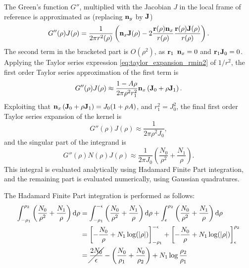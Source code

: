 The Green's function $G''$, multiplied with the Jacobian $J$ in the local frame of reference is approximated as (replacing ${\bf n}_y$ by ${\bf J}$)
%
\begin{equation}
	G''(\rho) J(\rho)
	= \frac{1}{2\pi r^2(\rho)} \left( {\bf n}_x {\bf J}(\rho) - 2 \frac{{\bf r}(\rho) {\bf n}_x}{r(\rho)} \frac{{\bf r}(\rho) {\bf J}(\rho)}{r(\rho)}\right)
	.
\end{equation}
%
The second term in the bracketed part is $O(\rho^2)$, as ${\bf r}_1$ ${\bf n}_x = 0$ and ${\bf r}_1 {\bf J}_0 = 0$.
Applying the Taylor series expression \eqref{eq:taylor_expansion_rmin2} of $1/r^2$, the first order Taylor series approximation of the first term is
%
\begin{equation}
	G''(\rho) J(\rho) \approx \frac{1 - A \rho}{2\pi \rho^2 r_1^2} {\bf n}_x \left({\bf J}_0 + \rho {\bf J}_1\right) 
	.
\end{equation}
%
Exploiting that ${\bf n}_x \left({\bf J}_0 + \rho {\bf J}_1\right) = J_0 (1 + \rho A)$, and $r_1^2 = J_0^2$, the final first order Taylor series expansion of the kernel is
%
\begin{equation}
	G''(\rho) J(\rho) \approx \frac{1}{2\pi \rho^2 J_0}
	,
\end{equation}
%
and the singular part of the integrand is
%
\begin{equation}
	G''(\rho) N(\rho) J(\rho) \approx \frac{1}{2\pi J_0} \left( \frac{N_0}{\rho^2} +  \frac{N_1}{\rho} \right)
	.
\end{equation}
%
This integral is evaluated analytically using Hadamard Finite Part integration, and the remaining part is evaluated numerically, using Gaussian quadratures.

The Hadamard Finite Part integration is performed as follows:
%
\begin{align}
	\int_{-\rho_1}^{\rho_2} \left( \frac{N_0}{\rho^2} +  \frac{N_1}{\rho} \right) \mathrm{d} \rho
	&= \int_{-\rho_1}^{-\epsilon} \left( \frac{N_0}{\rho^2} +  \frac{N_1}{\rho} \right) \mathrm{d} \rho
	+ \int_{\epsilon}^{\rho_2} \left( \frac{N_0}{\rho^2} +  \frac{N_1}{\rho} \right) \mathrm{d} \rho \\
	&= \left[ -\frac{N_0}{\rho} +  N_1\log(|\rho|) \right]_{-\rho_1}^{-\epsilon} +
	\left[ -\frac{N_0}{\rho} +  N_1\log(|\rho|) \right]_{\epsilon}^{\rho_2} \\
	&=  \cancel{\frac{2 N_0}{\epsilon} }
	- \left( \frac{N_0}{\rho_1} + \frac{N_0}{\rho_2} \right)
	+  N_1\log \frac{\rho_2}{\rho_1} 
\end{align}



